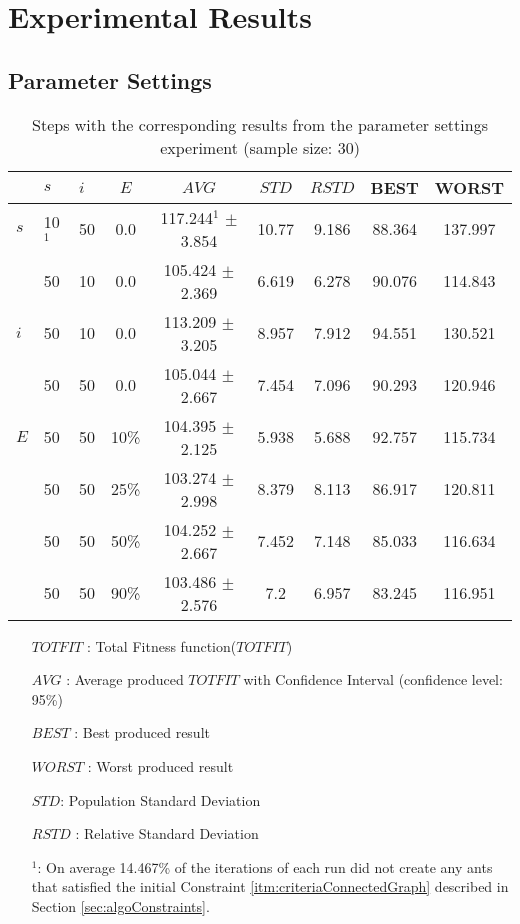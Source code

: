 \chapter{Experimental Results}
\label{appendixC}

\section{Parameter Settings}

\begin{sidewaystable}
    \centering
    \begin{tabular}{|l|l|l|c||c|c|c|c|c|}
    \hline
    ~ & $s$ & $i$ & $E$ & $AVG$ & $STD$ & $RSTD$ & BEST & WORST \\
    \hline
    $s$ & 10$^1$ & 50 & 0.0 & 117.244$^1$ $\pm$ 3.854 & 10.77 & 9.186 & 88.364 & 137.997\\
    ~ & 50 & 10 & 0.0 & 105.424 $\pm$ 2.369 & 6.619 & 6.278 & 90.076 & 114.843\\

    \hline
    $i$ & 50 & 10 & 0.0 & 113.209 $\pm$ 3.205 & 8.957 & 7.912 & 94.551 & 130.521\\
    ~ & 50 & 50 & 0.0 & 105.044 $\pm$ 2.667 & 7.454 & 7.096 & 90.293 & 120.946\\
    \hline
    $E$ & 50 & 50 & 10\% & 104.395 $\pm$ 2.125 & 5.938 & 5.688 & 92.757 & 115.734\\
    ~ & 50 & 50 & 25\% & 103.274 $\pm$ 2.998 & 8.379 & 8.113 & 86.917 & 120.811\\
    ~ & 50 & 50 & 50\% & 104.252 $\pm$ 2.667 & 7.452 & 7.148 & 85.033 & 116.634\\
    ~ & 50 & 50 & 90\% & 103.486 $\pm$ 2.576 & 7.2 & 6.957 & 83.245 & 116.951\\
    \hline
    \end{tabular}
    \caption {Steps with the corresponding results from the parameter settings experiment (sample size: 30)}
    \tiny
    \begin{itemize}[noitemsep]
    \item[$TOTFIT$ :] Total Fitness function($TOTFIT$)
    \item[$AVG$ :] Average produced $TOTFIT$ with Confidence Interval (confidence level: 95\%)
    \item[$BEST$ :] Best produced result
    \item[$WORST$ :] Worst produced result
    \item[$STD$:] Population Standard Deviation 
    \item[$RSTD$ :] Relative Standard Deviation 
    \item[$^1$:] On average 14.467\% of the iterations of each run did not create any ants that satisfied the initial Constraint \ref{itm:criteriaConnectedGraph} described in Section \vref{sec:algoConstraints}.
    \end{itemize}
    \label{table:pm1}
\end{sidewaystable}

